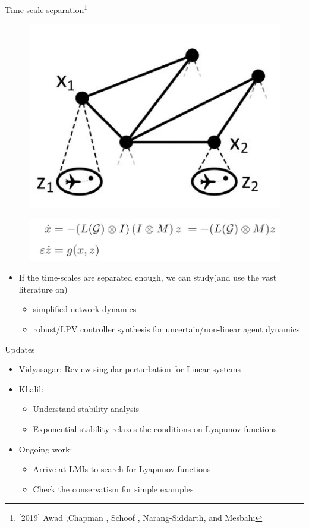 \documentclass{beamer}
\begin{document}
\begin{frame}{Time-scale separation\footnote{[2019] Awad ,Chapman , Schoof , Narang-Siddarth, and Mesbahi}}
	\begin{minipage}{0.45\textwidth}
		\begin{figure}
			\includegraphics[width=0.6\linewidth]{figures/Time_scale_separation.JPG}
			\label{fig:mjlstraj}
		\end{figure}
	\end{minipage}
	\begin{minipage}{0.45\textwidth}
		\begin{figure}
			\includegraphics[width=1.35\linewidth]{figures/Time_scale_sep_dyn_sys.JPG}
			\label{fig:mjlstraj}
		\end{figure}
	\end{minipage}	
	\begin{itemize}
		\item If the time-scales are separated enough, we can study(and use the vast literature on) 
		\begin{itemize}
			\item simplified network dynamics
			\item robust/LPV controller synthesis for uncertain/non-linear agent dynamics
		\end{itemize}
	\end{itemize}
\end{frame}
\begin{frame}{Updates}
	\begin{itemize}
		\item Vidyasagar: Review singular perturbation for Linear systems
		\item Khalil: 
		\begin{itemize}
			\item Understand stability analysis
			\item Exponential stability relaxes the conditions on Lyapunov functions 
		\end{itemize}
		\item Ongoing work:
		\begin{itemize}
			\item Arrive at LMIs to search for Lyapunov functions
			\item Check the conservatism for simple examples
		\end{itemize} 
	\end{itemize}
\end{frame}
\end{document}
